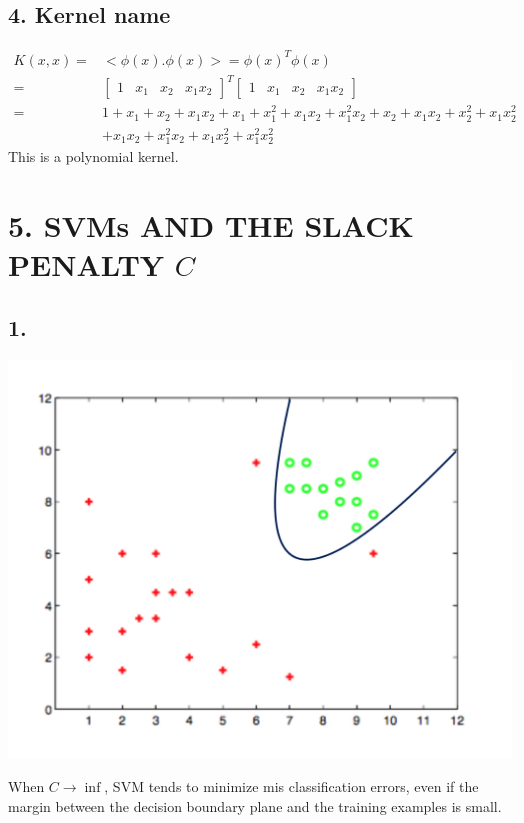\documentclass[letterpaper,doc,notimes]{apa6}
\begin{document}
\subsection{4. Kernel name}
\begin{align*}
	K(x,x) =& <\phi(x). \phi(x)>  = \phi(x)^T \phi(x) \\
	    =& [ \begin{smallmatrix}1 & x_1 & x_2 & x_1x_2  \end{smallmatrix} ]^T [ \begin{smallmatrix}1 & x_1 & x_2 & x_1x_2 \end{smallmatrix} ] \\
		=& 1 + x_1 + x_2 + x_1x_2   +   x_1 + x_1^2 + x_1x_2 + x_1^2x_2  +   x_2 + x_1x_2 + x_2^2 + x_1x_2^2  \\ 
		& + x_1x_2 + x_1^2x_2 + x_1x_2^2 + x_1^2x_2^2 
\end{align*}
This is a polynomial kernel.
\section{5. SVMs  AND THE SLACK PENALTY $C$}
\subsection{1. }
\begin{minipage}{0.5\textwidth} \includegraphics[scale=0.3]{5a} \end{minipage}
\begin{minipage}{0.5\textwidth}\raggedleft
When $C \rightarrow \inf$, SVM tends to minimize mis classification errors, even if the margin between the decision boundary plane and the training examples is small.
\end{minipage}
\end{document}
